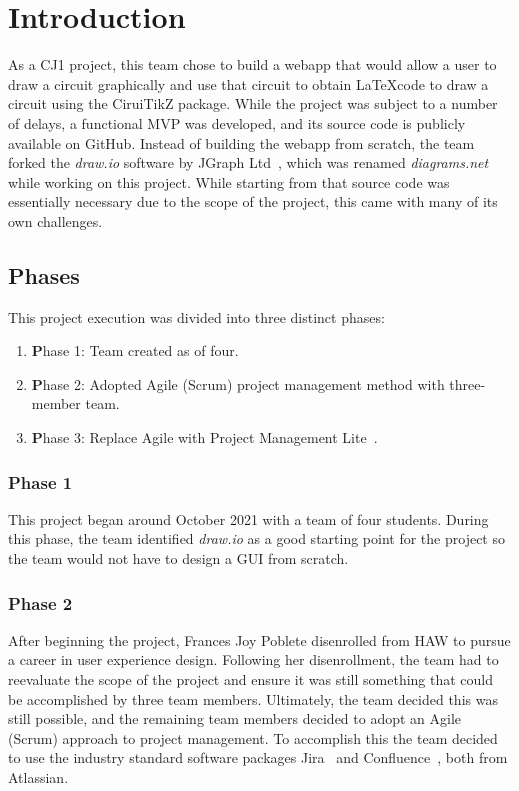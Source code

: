 %
\chapter{Introduction}\label{ch:introduction}
As a CJ1 project, this team chose to build a webapp that would allow a user to draw a circuit graphically and use that circuit to obtain \LaTeX code to draw a circuit using the CiruiTikZ package.
While the project was subject to a number of delays, a functional MVP was developed, and its source code is publicly available on GitHub.
Instead of building the webapp from scratch, the team forked the \emph{draw.io} software by JGraph Ltd~\cite{drawioCode}, which was renamed \emph{diagrams.net} while working on this project.
While starting from that source code was essentially necessary due to the scope of the project, this came with many of its own challenges.

\section{Phases}\label{sec:phases}
This project execution was divided into three distinct phases:
\begin{enumerate}
 \item {\textbf Phase 1}: Team created as of four.
 \item {\textbf Phase 2}: Adopted Agile (Scrum) project management method with three-member team.
 \item {\textbf Phase 3}: Replace Agile with Project Management Lite~\cite{pmlite}.
\end{enumerate}

\subsection{Phase 1}\label{subsec:phase-1}
This project began around October 2021 with a team of four students.
During this phase, the team identified \emph{draw.io} as a good starting point for the project so the team would not have to design a GUI from scratch.

\subsection{Phase 2}\label{subsec:phase-2}
After beginning the project, Frances Joy Poblete disenrolled from HAW to pursue a career in user experience design.
Following her disenrollment, the team had to reevaluate the scope of the project and ensure it was still something that could be accomplished by three team members.
Ultimately, the team decided this was still possible, and the remaining team members decided to adopt an Agile (Scrum) approach to project management.
To accomplish this the team decided to use the industry standard software packages Jira~\cite{jira} and Confluence~\cite{confluence}, both from Atlassian.

